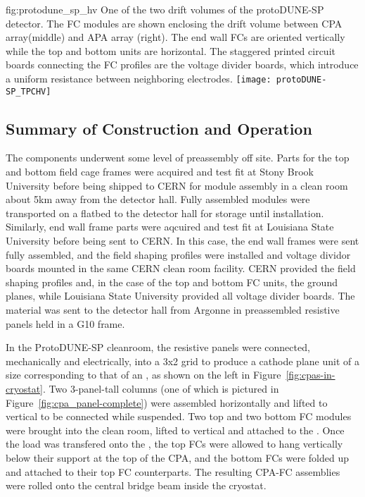 \begin{dunefigure}
{fig:protodune_sp_hv}
{One of the two drift volumes of the protoDUNE-SP detector. The FC modules are shown enclosing the drift volume between CPA array(middle) and APA array (right). The end wall FCs are oriented vertically while the top and bottom units are horizontal. The staggered printed circuit boards connecting the FC profiles are the voltage divider boards, which introduce a uniform resistance between neighboring electrodes.}
\texttt{[image: protoDUNE-SP\_TPCHV]}
\end{dunefigure}

\subsection{Summary of Construction and Operation}
The   components underwent some level of preassembly off site.
Parts for the top and bottom field cage frames were acquired and test fit at Stony Brook University before being shipped to CERN for module assembly in a clean room about 5km away from the detector hall.
Fully assembled modules were transported on a flatbed to the detector hall for storage until installation.
Similarly, end wall frame parts were aqcuired and test fit at Louisiana State University before being sent to CERN.
In this case, the end wall frames were sent fully assembled, and the field shaping profiles were installed and voltage dividor boards mounted in the same CERN clean room facility.
CERN provided the field shaping profiles and, in the case of the top and bottom FC units, the ground planes, while Louisiana State University provided all voltage divider boards.
The  material was sent to the detector hall from Argonne in preassembled resistive panels held in a G10 frame.

In the ProtoDUNE-SP cleanroom, the resistive panels were connected, mechanically and electrically, into a 3x2 grid to produce a cathode plane unit of a size corresponding to that of an , as shown on the left in Figure~\ref{fig:cpas-in-cryostat}.
Two 3-panel-tall columns (one of which is pictured in Figure~\ref{fig:cpa_panel-complete}) were assembled horizontally and lifted to vertical to be connected while suspended.
Two top and two bottom FC modules were brought into the clean room, lifted to vertical and attached to the .
Once the load was transfered onto the , the top FCs were allowed to hang vertically below their support at the top of the CPA, and the bottom FCs were folded up and attached to their top FC counterparts.
The resulting CPA-FC assemblies were rolled onto the central bridge beam inside the cryostat.

